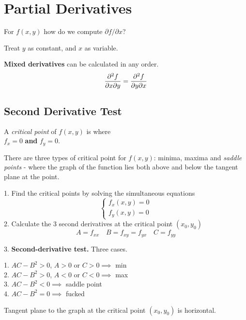 \section{Partial Derivatives}

For $f(x,y)$ how do we compute $\partial f / \partial x$?

Treat $y$ as constant, and $x$ as variable.

\textbf{Mixed derivatives} can be calculated in any order.
\begin{equation*}
    \pdv{f}{x}{y} = \pdv{f}{y}{x}
\end{equation*}

\subsection*{Second Derivative Test}

A \textit{critical point} of $f(x,y)$ is where \\
$f_x = 0$ \textbf{and} $f_y = 0$.

There are three types of critical point for $f(x,y)$: minima, maxima and \textit{saddle points} - where the graph
of the function lies both above and below the tangent plane at the point.
\vspace{\baselineskip}

1. Find the critical points by solving the simultaneous equations
\begin{equation*}
\begin{cases}
    f_x(x,y) = 0 \\
    f_y(x,y) = 0
\end{cases}
\end{equation*}
2. Calculate the 3 second derivatives at the critical point $(x_0, y_0)$
\begin{equation*}
    A = f_{xx} \quad B = f_{xy} = f_{yx} \quad C = f_{yy}
\end{equation*}

3. \textbf{Second-derivative test.} Three cases.

1. $AC - B^2 > 0$, $A > 0$ or $C > 0 \implies$ min \\
2. $AC - B^2 > 0$, $A < 0$ or $C < 0 \implies$ max \\
3. $AC - B^2 < 0 \implies$ saddle point \\
4. $AC - B^2 = 0 \implies$ fucked

Tangent plane to the graph at the critical point $(x_0, y_0)$ is horizontal.